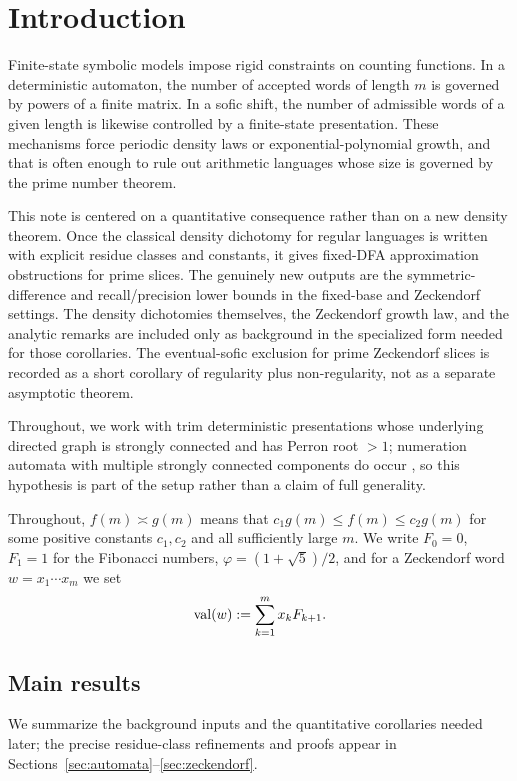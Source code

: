 \section{Introduction}\label{sec:introduction}

Finite-state symbolic models impose rigid constraints on counting
functions. In a deterministic automaton, the number of accepted words
of length \(m\) is governed by powers of a finite matrix. In a sofic
shift, the number of admissible words of a given length is likewise
controlled by a finite-state presentation. These mechanisms force
periodic density laws or exponential-polynomial growth, and that is
often enough to rule out arithmetic languages whose size is governed by
the prime number theorem.

This note is centered on a quantitative consequence rather than on a
new density theorem. Once the classical density dichotomy for regular
languages is written with explicit residue classes and constants, it
gives fixed-DFA approximation obstructions for prime slices. The
genuinely new outputs are the symmetric-difference and recall/precision
lower bounds in the fixed-base and Zeckendorf settings. The density
dichotomies themselves, the Zeckendorf growth law, and the analytic
remarks are included only as background in the specialized form needed
for those corollaries. The eventual-sofic exclusion for prime
Zeckendorf slices is recorded as a short corollary of regularity plus
non-regularity, not as a separate asymptotic theorem.

Throughout, we work with trim deterministic presentations whose
underlying directed graph is strongly connected and has Perron root
\(>1\); numeration automata with multiple strongly connected components
do occur \cite{CharlierRampersadRigoWaxweiler2010}, so this hypothesis
is part of the setup rather than a claim of full generality.

Throughout, \(f(m)\asymp g(m)\) means that \(c_1g(m)\le f(m)\le c_2g(m)\)
for some positive constants \(c_1,c_2\) and all sufficiently large
\(m\). We write \(F_0=0\), \(F_1=1\) for the Fibonacci numbers,
\(\varphi=(1+\sqrt5)/2\), and for a Zeckendorf word
\(w=x_1\cdots x_m\) we set
\[
  \operatorname{val}(w):=\sum_{k=1}^m x_kF_{k+1}.
\]

\subsection{Main results}

We summarize the background inputs and the quantitative corollaries
needed later; the precise residue-class refinements and proofs appear
in Sections~\ref{sec:automata}--\ref{sec:zeckendorf}.

